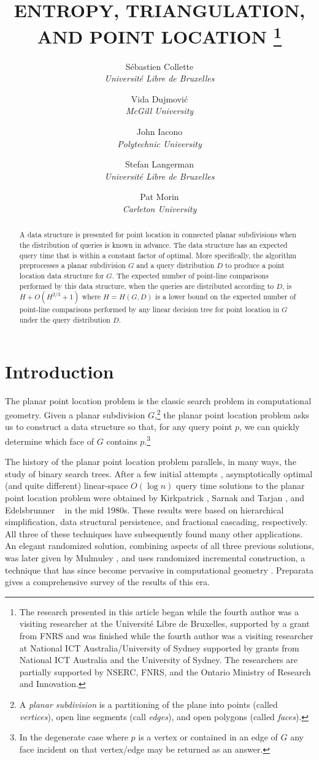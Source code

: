 \documentclass[lotsofwhite]{patmorin}
\title{\MakeUppercase{Entropy, Triangulation, and Point Location}%
	\thanks{The research presented in this article began
while the fourth author was a visiting researcher at the Universit\'e Libre de
Bruxelles, supported by a grant from FNRS and was finished while
 the fourth author was a visiting researcher at National ICT 
Australia/University of
Sydney supported by grants from National ICT Australia and the
University of Sydney.  The researchers are
partially supported by NSERC, FNRS, and the Ontario Ministry of Research and
Innovation.}}
\author{S\'ebastien Collette \\ \textit{Universit\'e Libre de Bruxelles}
  \and Vida Dujmovi\'c \\ \textit{McGill University}
  \and John Iacono \\ \textit{Polytechnic University}
  \and Stefan Langerman \\ \textit{Universit\'e Libre de Bruxelles}
  \and Pat Morin \\ \textit{Carleton University}}
\begin{document}
\maketitle

\begin{abstract}
  A data structure is presented for point location in connected planar
  subdivisions when the distribution of queries is known in advance.
  The data structure has an expected query time that is within a
  constant factor of optimal.  More specifically, the algorithm
  preprocesses a planar subdivision $G$ and a query distribution $D$ to
  produce a point location data structure for $G$. The expected number
  of point-line comparisons performed by this data structure, when the
  queries are distributed according to $D$, is $H +
  O(H^{2/3}+1)$ where $H=H(G,D)$ is a lower bound on the expected number of
  point-line comparisons performed by any linear decision tree for point
  location in $G$ under the query distribution $D$.
\end{abstract}

\section{Introduction}

The planar point location problem is the classic search problem in
computational geometry. Given a planar subdivision $G$,\footnote{A
\emph{planar subdivision} is a partitioning of the plane into points
(called \emph{vertices}), open line segments (call \emph{edges}), and
open polygons (called \emph{faces}).} the planar point location
problem asks us to construct a data structure so that, for any query
point $p$, we can quickly determine which face of $G$ contains
$p$.\footnote{In the degenerate case where $p$ is a vertex or
contained in an edge of $G$ any face incident on that vertex/edge may
be returned as an answer.}

The history of the planar point location problem parallels, in many
ways, the study of binary search trees.  After a few initial attempts
\cite{dl76,lp77,p81}, asymptotically optimal (and quite different)
linear-space $O(\log n)$ query time solutions to the planar point
location problem were obtained by Kirkpatrick \cite{k83}, Sarnak and
Tarjan \cite{st86}, and Edelsbrunner \etal\ \cite{egs86} in the mid
1980s.  These results were based on hierarchical simplification, data
structural persistence, and fractional cascading, respectively.  All
three of these techniques have subsequently found many other
applications.  An elegant randomized solution, combining aspects of
all three previous solutions, was later given by Mulmuley \cite{m90},
and uses randomized incremental construction, a technique that has
since become pervasive in computational geometry
\cite[Section~9.5]{bcko08}.  Preparata \cite{p90} gives a
comprehensive survey of the results of this era.
\end{document}
